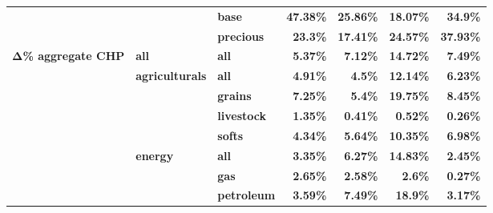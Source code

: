 \documentclass[
  authoryear,
  preprint,
  3p]{elsarticle}
\begin{document}
\begin{longtable}[t]{>{}l>{}l>{}l>{}r>{}r>{}r>{}r}
\textbf{} & \textbf{} & \textbf{base} & \textcolor[HTML]{4285f4}{\textbf{47.38\%}} & \textcolor[HTML]{4285f4}{\textbf{25.86\%}} & \textcolor[HTML]{4285f4}{\textbf{18.07\%}} & \textcolor[HTML]{4285f4}{\textbf{34.9\%}}\\
\addlinespace
\textbf{} & \textbf{} & \textbf{precious} & \textcolor[HTML]{4285f4}{\textbf{23.3\%}} & \textcolor[HTML]{4285f4}{\textbf{17.41\%}} & \textcolor[HTML]{4285f4}{\textbf{24.57\%}} & \textcolor[HTML]{4285f4}{\textbf{37.93\%}}\\
\textbf{Δ\% aggregate CHP} & \textbf{all} & \textbf{all} & \textcolor[HTML]{4285f4}{\textbf{5.37\%}} & \textcolor[HTML]{4285f4}{\textbf{7.12\%}} & \textcolor[HTML]{4285f4}{\textbf{14.72\%}} & \textcolor[HTML]{4285f4}{\textbf{7.49\%}}\\
\textbf{} & \textbf{agriculturals} & \textbf{all} & \textcolor[HTML]{4285f4}{\textbf{4.91\%}} & \textcolor[HTML]{4285f4}{\textbf{4.5\%}} & \textcolor[HTML]{4285f4}{\textbf{12.14\%}} & \textcolor[HTML]{4285f4}{\textbf{6.23\%}}\\
\textbf{} & \textbf{} & \textbf{grains} & \textcolor[HTML]{4285f4}{\textbf{7.25\%}} & \textcolor[HTML]{4285f4}{\textbf{5.4\%}} & \textcolor[HTML]{4285f4}{\textbf{19.75\%}} & \textcolor[HTML]{4285f4}{\textbf{8.45\%}}\\
\textbf{} & \textbf{} & \textbf{livestock} & \textcolor[HTML]{4285f4}{\textbf{1.35\%}} & \textcolor[HTML]{4285f4}{\textbf{0.41\%}} & \textcolor[HTML]{4285f4}{\textbf{0.52\%}} & \textcolor[HTML]{4285f4}{\textbf{0.26\%}}\\
\addlinespace
\textbf{} & \textbf{} & \textbf{softs} & \textcolor[HTML]{4285f4}{\textbf{4.34\%}} & \textcolor[HTML]{4285f4}{\textbf{5.64\%}} & \textcolor[HTML]{4285f4}{\textbf{10.35\%}} & \textcolor[HTML]{4285f4}{\textbf{6.98\%}}\\
\textbf{} & \textbf{energy} & \textbf{all} & \textcolor[HTML]{4285f4}{\textbf{3.35\%}} & \textcolor[HTML]{4285f4}{\textbf{6.27\%}} & \textcolor[HTML]{4285f4}{\textbf{14.83\%}} & \textcolor[HTML]{4285f4}{\textbf{2.45\%}}\\
\textbf{} & \textbf{} & \textbf{gas} & \textcolor[HTML]{4285f4}{\textbf{2.65\%}} & \textcolor[HTML]{4285f4}{\textbf{2.58\%}} & \textcolor[HTML]{4285f4}{\textbf{2.6\%}} & \textcolor[HTML]{4285f4}{\textbf{0.27\%}}\\
\textbf{} & \textbf{} & \textbf{petroleum} & \textcolor[HTML]{4285f4}{\textbf{3.59\%}} & \textcolor[HTML]{4285f4}{\textbf{7.49\%}} & \textcolor[HTML]{4285f4}{\textbf{18.9\%}} & \textcolor[HTML]{4285f4}{\textbf{3.17\%}}\\

\end{longtable}
\end{document}
